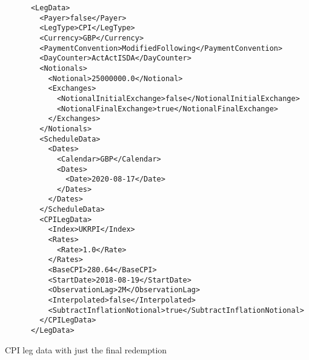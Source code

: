 \begin{listing}[H]
\begin{verbatim}
      <LegData>
        <Payer>false</Payer>
        <LegType>CPI</LegType>
        <Currency>GBP</Currency>
        <PaymentConvention>ModifiedFollowing</PaymentConvention>
        <DayCounter>ActActISDA</DayCounter>
        <Notionals>
          <Notional>25000000.0</Notional>
          <Exchanges>
            <NotionalInitialExchange>false</NotionalInitialExchange>
            <NotionalFinalExchange>true</NotionalFinalExchange>
          </Exchanges>
        </Notionals>
        <ScheduleData>
          <Dates>
            <Calendar>GBP</Calendar>
            <Dates>
              <Date>2020-08-17</Date>
            </Dates>
          </Dates>
        </ScheduleData>
        <CPILegData>
          <Index>UKRPI</Index>
          <Rates>
            <Rate>1.0</Rate>
          </Rates>
          <BaseCPI>280.64</BaseCPI>
          <StartDate>2018-08-19</StartDate>
          <ObservationLag>2M</ObservationLag>
          <Interpolated>false</Interpolated>
          <SubtractInflationNotional>true</SubtractInflationNotional>
        </CPILegData>
      </LegData>
\end{verbatim}
\caption{CPI leg data with just the final redemption}
\label{lst:cpilegdatafinal}
\end{listing}

